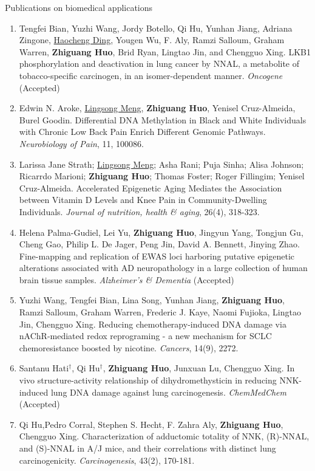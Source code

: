 \documentclass{resume} %
\begin{document}
\begin{rSection}{Publications on biomedical applications}
\begin{enumerate}[noitemsep,topsep=0pt, resume]
\item
Tengfei Bian, Yuzhi Wang, Jordy Botello, Qi Hu, Yunhan Jiang, Adriana Zingone, \underline{Haocheng Ding}, Yougen Wu, F. Aly, Ramzi Salloum, Graham Warren, {\bf Zhiguang Huo}, Brid Ryan, Lingtao Jin, and Chengguo Xing. 
LKB1 phosphorylation and deactivation in lung cancer by NNAL, a metabolite of tobacco-specific carcinogen, in an isomer-dependent manner.
\emph{Oncogene} (Accepted)

\item
Edwin N. Aroke, \underline{Lingsong Meng}, {\bf Zhiguang Huo}, Yenisel Cruz-Almeida, Burel Goodin.
Differential DNA Methylation in Black and White Individuals with Chronic Low Back Pain Enrich Different Genomic Pathways. 
\emph{Neurobiology of Pain}, 11, 100086.

\item
Larissa Jane Strath; \underline{Lingsong Meng}; Asha Rani; Puja Sinha; Alisa Johnson; Ricarrdo Marioni; {\bf Zhiguang Huo}; Thomas Foster; Roger Fillingim; Yenisel Cruz-Almeida. 
Accelerated Epigenetic Aging Mediates the Association between Vitamin D Levels and Knee Pain in Community-Dwelling Individuals. 
\emph{Journal of nutrition, health \& aging}, 26(4), 318-323.

\item
Helena Palma-Gudiel, Lei Yu, {\bf Zhiguang Huo}, Jingyun Yang, Tongjun Gu, Cheng Gao, Philip L. De Jager, Peng Jin, David A. Bennett, Jinying Zhao.
Fine-mapping and replication of EWAS loci harboring putative epigenetic alterations associated with AD neuropathology in a large collection of human brain tissue samples. \emph{Alzheimer's \& Dementia} (Accepted)

\item
Yuzhi Wang, Tengfei Bian, Lina Song, Yunhan Jiang, {\bf Zhiguang Huo}, Ramzi Salloum, Graham Warren, Frederic J. Kaye, Naomi Fujioka, Lingtao Jin, Chengguo Xing.
Reducing chemotherapy-induced DNA damage via nAChR-mediated redox reprograming - a new mechanism for SCLC chemoresistance boosted by nicotine.
\emph{Cancers}, 14(9), 2272.

\item
Santanu Hati$^\dagger$, Qi Hu$^\dagger$, {\bf Zhiguang Huo}, Junxuan Lu, Chengguo Xing. 
In vivo structure-activity relationship of dihydromethysticin in reducing NNK-induced lung DNA damage against lung carcinogenesis.
\emph{ChemMedChem} (Accepted)

\item
Qi Hu,Pedro Corral, Stephen S. Hecht, F. Zahra Aly,  {\bf Zhiguang Huo}, Chengguo Xing.
Characterization of adductomic totality of NNK, (R)-NNAL, and (S)-NNAL in A/J mice, and their correlations with distinct lung carcinogenicity. 
\emph{Carcinogenesis}, 43(2), 170-181.


\end{enumerate}
\end{rSection}
\end{document}
